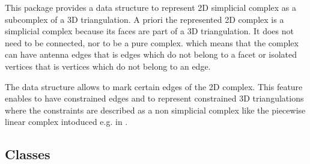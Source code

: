 \label{ref_chapter_Complex2inTriangulation3}
\label{ref_chapter_C2inT3}

\vspace*{-15mm}
\minitoc
\vspace*{30mm}

This package provides a data structure to  represent 
2D simplicial complex as a subcomplex of a 3D triangulation.
A priori the represented 2D complex is a  simplicial complex
because its faces are part of a 3D triangulation.
It does not need to be connected, nor to be a pure complex.
which  means that the complex can have antenna edges 
that is edges which do not belong to a facet or
isolated vertices that is vertices  which do not belong to
an edge.

The data structure allows to mark certain edges of the 2D complex.
This feature enables  to have  constrained edges
and to represent constrained 3D triangulations
where the constraints are described 
as a non simplicial complex like the piecewise linear complex
intoduced  e.g. in \cite{s-cgehd-98}.

\subsection*{Classes}
